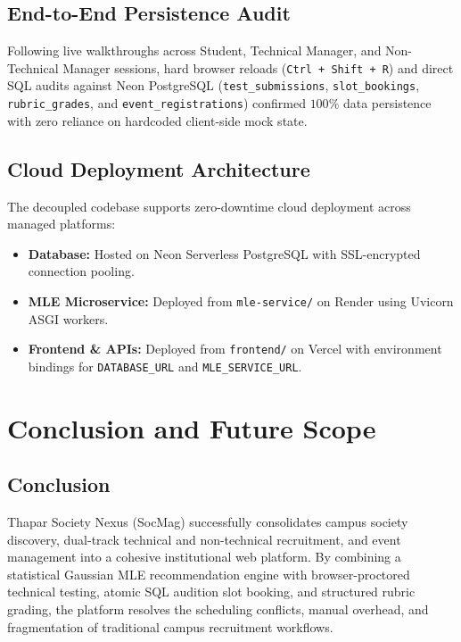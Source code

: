 \documentclass[12pt,a4paper]{report}
\begin{document}
\section{End-to-End Persistence Audit}
Following live walkthroughs across Student, Technical Manager, and Non-Technical Manager sessions, hard browser reloads (\texttt{Ctrl + Shift + R}) and direct SQL audits against Neon PostgreSQL (\texttt{test\_submissions}, \texttt{slot\_bookings}, \texttt{rubric\_grades}, and \texttt{event\_registrations}) confirmed $100\%$ data persistence with zero reliance on hardcoded client-side mock state.

\section{Cloud Deployment Architecture}
The decoupled codebase supports zero-downtime cloud deployment across managed platforms:
\begin{itemize}[noitemsep]
    \item \textbf{Database:} Hosted on Neon Serverless PostgreSQL with SSL-encrypted connection pooling.
    \item \textbf{MLE Microservice:} Deployed from \texttt{mle-service/} on Render using Uvicorn ASGI workers.
    \item \textbf{Frontend \& APIs:} Deployed from \texttt{frontend/} on Vercel with environment bindings for \texttt{DATABASE\_URL} and \texttt{MLE\_SERVICE\_URL}.
\end{itemize}

\chapter{Conclusion and Future Scope}

\section{Conclusion}
Thapar Society Nexus (SocMag) successfully consolidates campus society discovery, dual-track technical and non-technical recruitment, and event management into a cohesive institutional web platform. By combining a statistical Gaussian MLE recommendation engine with browser-proctored technical testing, atomic SQL audition slot booking, and structured rubric grading, the platform resolves the scheduling conflicts, manual overhead, and fragmentation of traditional campus recruitment workflows.
\end{document}

